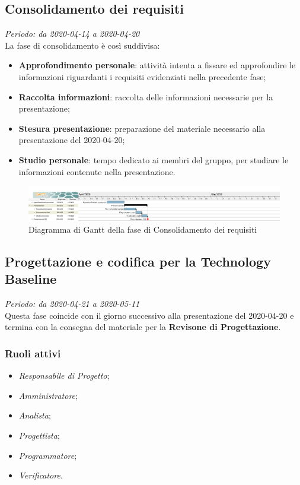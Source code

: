\subsection{Consolidamento dei requisiti}
\textit{Periodo: da 2020-04-14 a 2020-04-20}\\
La fase di consolidamento è così suddivisa:
\begin{itemize}
\item \textbf{Approfondimento personale}: attività intenta a fissare ed approfondire le informazioni riguardanti i requisiti evidenziati nella precedente fase;
\item \textbf{Raccolta informazioni}: raccolta delle informazioni necessarie per la presentazione;
\item \textbf{Stesura presentazione}: preparazione del materiale necessario alla presentazione del 2020-04-20;
\item \textbf{Studio personale}: tempo dedicato ai membri del gruppo, per studiare le informazioni contenute nella presentazione.
\end{itemize}

\begin{figure}[H]
\centering
\includegraphics[scale=0.24]{./img/gantt/consolidamento_requisiti.png}
\caption{Diagramma di Gantt della fase di Consolidamento dei requisiti}
\end{figure}

\subsection{Progettazione e codifica per la Technology Baseline}
\textit{Periodo: da 2020-04-21 a 2020-05-11}\\
Questa fase coincide con il giorno successivo alla presentazione del 2020-04-20 e termina con la consegna del materiale per la \textbf{Revisone di Progettazione}.

\subsubsection{Ruoli attivi} \begin{itemize}
\item \textit{Responsabile di Progetto};
\item \textit{Amministratore};
\item \textit{Analista};
\item \textit{Progettista};
\item \textit{Programmatore};
\item \textit{Verificatore}.
\end{itemize}

